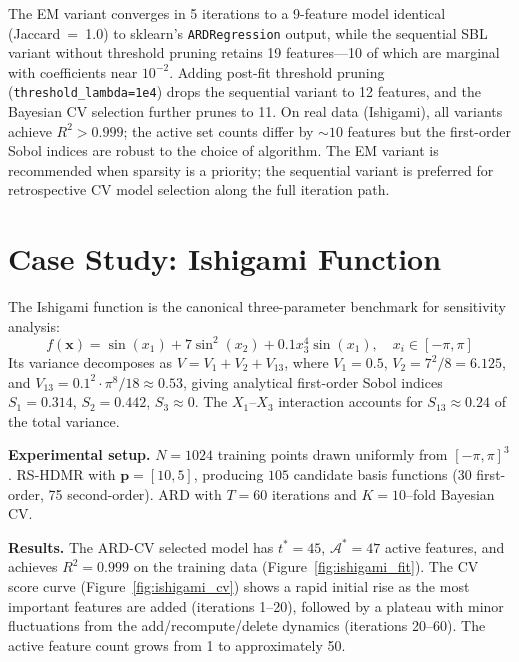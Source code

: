 \documentclass[11pt,a4paper]{article}
\begin{document}
The EM variant converges in 5 iterations to a 9-feature model identical (Jaccard~=~1.0) to sklearn's \texttt{ARDRegression} output, while the sequential SBL variant without threshold pruning retains 19 features---10 of which are marginal with coefficients near $10^{-2}$.  Adding post-fit threshold pruning (\texttt{threshold\_lambda=1e4}) drops the sequential variant to 12 features, and the Bayesian CV selection further prunes to 11.  On real data (Ishigami), all variants achieve $R^2 > 0.999$; the active set counts differ by $\sim 10$ features but the first-order Sobol indices are robust to the choice of algorithm.  The EM variant is recommended when sparsity is a priority; the sequential variant is preferred for retrospective CV model selection along the full iteration path.

\section{Case Study: Ishigami Function}

The Ishigami function \citep{ishigami1990} is the canonical three-parameter benchmark for sensitivity analysis:
\begin{equation}
f(\mathbf{x}) = \sin(x_1) + 7\sin^2(x_2) + 0.1 x_3^4 \sin(x_1), \quad x_i \in [-\pi, \pi]
\label{eq:ishigami}
\end{equation}
Its variance decomposes as $V = V_1 + V_2 + V_{13}$, where $V_1 = 0.5$, $V_2 = 7^2/8 = 6.125$, and $V_{13} = 0.1^2 \cdot \pi^8/18 \approx 0.53$, giving analytical first-order Sobol indices $S_1 = 0.314$, $S_2 = 0.442$, $S_3 \approx 0$. The $X_1$--$X_3$ interaction accounts for $S_{13} \approx 0.24$ of the total variance.

\textbf{Experimental setup.} $N = 1024$ training points drawn uniformly from $[-\pi,\pi]^3$. RS-HDMR with $\mathbf{p} = [10, 5]$, producing $105$ candidate basis functions (30 first-order, 75 second-order). ARD with $T=60$ iterations and $K=10$--fold Bayesian CV.

\textbf{Results.} The ARD-CV selected model has $t^* = 45$, $\mathcal{A}^* = 47$ active features, and achieves $R^2 = 0.999$ on the training data (Figure~\ref{fig:ishigami_fit}). The CV score curve (Figure~\ref{fig:ishigami_cv}) shows a rapid initial rise as the most important features are added (iterations 1--20), followed by a plateau with minor fluctuations from the add/recompute/delete dynamics (iterations 20--60). The active feature count grows from 1 to approximately 50.
\end{document}
